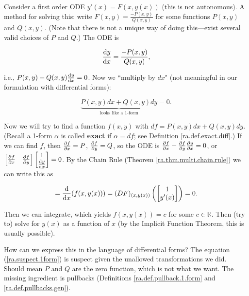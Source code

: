 \begin{remark}

Consider a first order ODE \(y'(x) = F(x, y(x))\) (this is not autonomous). A method for solving this: write \(F(x,y) = \frac{- P(x,y)}{Q(x,y)}\) for some functions \(P(x,y)\) and \(Q(x,y)\). (Note that there is not a unique way of doing this---exist several valid choices of \(P\) and \(Q\).) The ODE is

\[
\deriv{y}{x} = \frac{-P(x,y)}{Q(x,y)},
\]

i.e., \(P(x,y) + Q(x,y) \deriv{y}{x}  = 0\). Now we ``multiply by \(dx\)" (not meaningful in our formulation with differential forms):

\begin{equation}\label{ra.suspect.1form}
\underbrace{P(x,y) dx + Q(x,y) dy}_{\text{looks like a 1-form}} = 0.
\end{equation}

Now we will try to find a function \(f(x,y)\) with \(df= P(x,y) dx + Q(x,y) dy\). (Recall a 1-form \(\alpha\) is called \textbf{exact} if \(\alpha = df\); see Definition \ref{ra.def.exact.diff}.) If we can find \(f\), then \(\pderiv{f}{x} = P\), \(\pderiv{f}{y} = Q\), so the ODE is \(\pderiv{f}{x} + \pderiv{f}{y} \pderiv{y}{x} = 0\), or \(\begin{bmatrix} \pderiv{f}{x} & \pderiv{f}{y} \end{bmatrix} \begin{bmatrix} 1 \\ \deriv{y}{x} \end{bmatrix} = 0\). By the Chain Rule (Theorem \ref{ra.thm.multi.chain.rule}) we can write this as 

\[
= \deriv{}{x}(f(x,y(x))) = (DF)_{(x,y(x))} \left( \begin{bmatrix} 1 \\ y'(x) \end{bmatrix} \right) = 0.
\]

Then we can integrate, which yields \(f(x,y(x)) = c\) for some \(c \in \mathbb{R}\). Then (try to) solve for \(y(x)\) as a function of \(x\) (by the Implicit Function Theorem, this is usually possible).

How can we express this in the language of differential forms? The equation (\ref{ra.suspect.1form}) is suspect given the unallowed transformations we did. Should mean \(P\) and \(Q\) are the zero function, which is not what we want. The missing ingredient is pullbacks (Definitions \ref{ra.def.pullback.1.form} and \ref{ra.def.pullbacks.gen}).


\end{remark}

